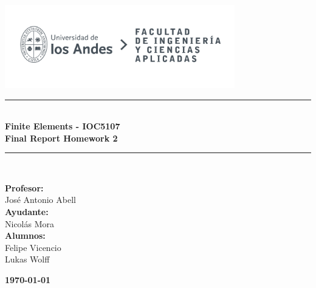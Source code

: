 \documentclass{article}  %
\begin{document}
\begin{titlepage}%
\newcommand{\HRule}{\rule{\linewidth}{0.5mm}} 
\center 
\includegraphics[width=10cm]{LOGO_UNIVERSIDAD.jpg}\\ %
\vspace{3cm}
\HRule \\[0.4cm]
{ \huge \bfseries Finite Elements - IOC5107}\\[0.4cm] %
{ \huge \bfseries Final Report Homework 2}\\[0.4cm] %
\HRule \\[1.5cm]
 \vspace{5cm}
\begin{flushright}
  { \textbf{Profesor:}\\
  José Antonio Abell\\
  \textbf{Ayudante:}\\
  Nicolás Mora\\
  \textbf{Alumnos:} \\
  Felipe Vicencio\\
  Lukas Wolff\\
}
\end{flushright}
\vspace{1cm}
{\large \textbf{\today}}\\[2cm] %
\end{titlepage}
\end{document}
